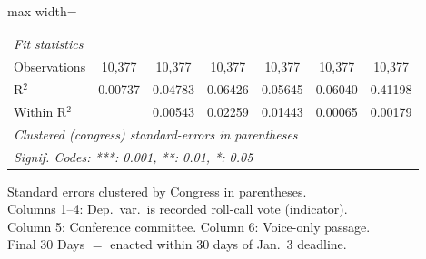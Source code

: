 \begin{table}[htbp]
\begin{adjustbox}{max width=\textwidth}
\begin{tabular}{lcccccc}
      \midrule
      \emph{Fit statistics}\\
      Observations            & 10,377          & 10,377          & 10,377          & 10,377         & 10,377        & 10,377\\  
      R$^2$                   & 0.00737         & 0.04783         & 0.06426         & 0.05645        & 0.06040       & 0.41198\\  
      Within R$^2$            &                 & 0.00543         & 0.02259         & 0.01443        & 0.00065       & 0.00179\\  
      \midrule \midrule
      \multicolumn{7}{l}{\emph{Clustered (congress) standard-errors in parentheses}}\\
      \multicolumn{7}{l}{\emph{Signif. Codes: ***: 0.001, **: 0.01, *: 0.05}}\\
   \end{tabular}
   \end{adjustbox}

   \par \raggedright 
   Standard errors clustered by Congress in parentheses.\\
   Columns 1--4: Dep.~var.~is recorded roll-call vote (indicator).\\
   Column 5: Conference committee. Column 6: Voice-only passage.\\
   Final 30 Days $=$ enacted within 30 days of Jan.~3 deadline.
\end{table}


